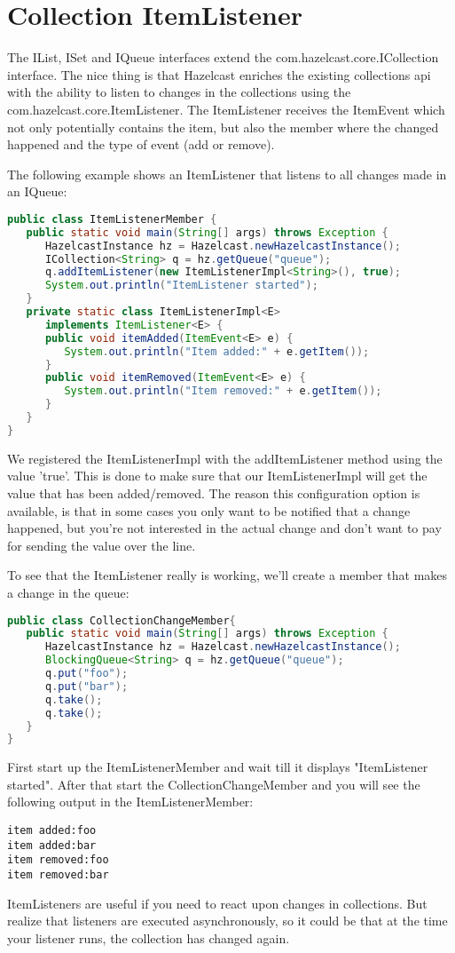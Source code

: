 \section{Collection ItemListener}
The IList, ISet and IQueue interfaces extend the com.hazelcast.core.ICollection interface. The nice thing is that Hazelcast enriches the existing collections api with the ability to listen to changes in the collections using the com.hazelcast.core.ItemListener. The ItemListener receives the ItemEvent which not only potentially contains the item, but also the member where the changed happened and the type of event (add or remove).

The following example shows an ItemListener that listens to all changes made in an IQueue:
\begin{lstlisting}[language=java]
public class ItemListenerMember {
   public static void main(String[] args) throws Exception {
      HazelcastInstance hz = Hazelcast.newHazelcastInstance();
      ICollection<String> q = hz.getQueue("queue");
      q.addItemListener(new ItemListenerImpl<String>(), true);
      System.out.println("ItemListener started");
   }
   private static class ItemListenerImpl<E> 
      implements ItemListener<E> {
      public void itemAdded(ItemEvent<E> e) {
         System.out.println("Item added:" + e.getItem());
      }
      public void itemRemoved(ItemEvent<E> e) {
         System.out.println("Item removed:" + e.getItem());
      }
   }
}
\end{lstlisting}
We registered the ItemListenerImpl with the addItemListener method using the value 'true'. This is done to make sure that our ItemListenerImpl will get the value that has been added/removed. The reason this configuration option is available, is that in some cases you only want to be notified that a change happened, but you're not interested in the actual change and don't want to pay for sending the value over the line.

To see that the ItemListener really is working, we'll create a member that makes a change in the queue:
\begin{lstlisting}[language=java]
public class CollectionChangeMember{
   public static void main(String[] args) throws Exception {
      HazelcastInstance hz = Hazelcast.newHazelcastInstance();
      BlockingQueue<String> q = hz.getQueue("queue");
      q.put("foo");
      q.put("bar");
      q.take();
      q.take();
   }
}
\end{lstlisting}
First start up the ItemListenerMember and wait till it displays "ItemListener started". After that start the CollectionChangeMember and you will see the following output in the ItemListenerMember:
\begin{lstlisting}
item added:foo
item added:bar
item removed:foo
item removed:bar
\end{lstlisting}
ItemListeners are useful if you need to react upon changes in collections. But realize that listeners are executed asynchronously, so it could be that at the time your listener runs,  the collection has changed again. 


